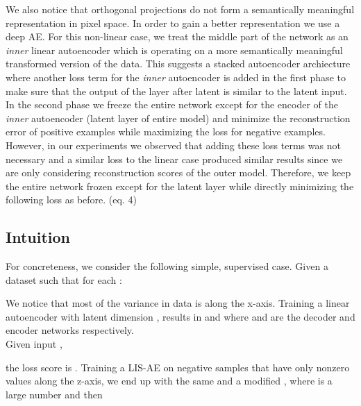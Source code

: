 \documentclass[acmtog, nonacm]{acmart}
\begin{document}
We also notice that orthogonal projections do not form a semantically meaningful representation in pixel space. In order to gain a better representation we use a deep AE. For this non-linear case, we treat the middle part of the network as an \textit{inner} linear autoencoder which is operating on a more semantically meaningful transformed version of the data. 
This suggests a stacked autoencoder archiecture where another loss term for the \textit{inner} autoencoder is added in the first phase to make sure that the output of the layer after latent is similar to the latent input. In the second phase we freeze the entire network except for the encoder of the \textit{inner} autoencoder (latent layer of entire model) and minimize the reconstruction error of positive examples while maximizing the loss for negative examples.
However, in our experiments we observed that adding these loss terms was not necessary and a similar loss to the linear case produced similar results since we are only considering reconstruction scores of the outer model. Therefore, we keep the entire network frozen except for the latent layer while directly minimizing the following loss as before. (eq. 4)
\subsection{Intuition}
For concreteness, we consider the following simple, supervised case. Given a dataset  such that for each :

\noindent
We notice that most of the variance in data is along the x-axis. Training a linear autoencoder with latent dimension , results in  and  where  and  are the decoder and encoder networks respectively.\\
Given input ,

the loss score is . Training a LIS-AE on negative samples that have only nonzero values along the z-axis, we end up with the same  and a modified , where  is a large number and then
\end{document}
